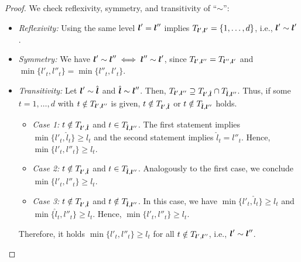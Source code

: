 \begin{proof}
  We check reflexivity, symmetry, and transitivity of ``$\sim$'':
  \begin{itemize}
    \item
    \emph{Reflexivity:}
    Using the same level ${\boldsymbol{l}}' = {\boldsymbol{l}}''$ implies
    $T_{{\boldsymbol{l}}',{\boldsymbol{l}}'} = \{1, \dotsc, d\}$,
    i.e., ${\boldsymbol{l}}' \sim {\boldsymbol{l}}'$.
    
    \item
    \emph{Symmetry:}
    We have
    ${\boldsymbol{l}}' \sim {\boldsymbol{l}}'' \iff {\boldsymbol{l}}'' \sim {\boldsymbol{l}}'$, since
    $T_{{\boldsymbol{l}}',{\boldsymbol{l}}''} = T_{{\boldsymbol{l}}'',{\boldsymbol{l}}'}$ and
    $\min\{l'_t, l''_t\} = \min\{l''_t, l'_t\}$.
    
    \item
    \emph{Transitivity:}
    Let ${\boldsymbol{l}}' \sim \hat{{\boldsymbol{l}}}$ and $\hat{{\boldsymbol{l}}} \sim {\boldsymbol{l}}''$.
    Then, $T_{{\boldsymbol{l}}',{\boldsymbol{l}}''} \supseteq T_{{\boldsymbol{l}}',\hat{{\boldsymbol{l}}}} \cap T_{\hat{{\boldsymbol{l}}},{\boldsymbol{l}}''}$.
    Thus, if some $t = 1, \dotsc, d$ with $t \notin T_{{\boldsymbol{l}}',{\boldsymbol{l}}''}$ is given,
    $t \notin T_{{\boldsymbol{l}}',\hat{{\boldsymbol{l}}}}$ or $t \notin T_{\hat{{\boldsymbol{l}}},{\boldsymbol{l}}''}$ holds.
    \begin{itemize}
      \item
      \emph{Case 1:}
      $t \notin T_{{\boldsymbol{l}}',\hat{{\boldsymbol{l}}}}$ and $t \in T_{\hat{{\boldsymbol{l}}},{\boldsymbol{l}}''}$.
      The first statement implies $\min\{l'_t, \hat{l}_t\} \ge l_t$
      and the second statement implies $\hat{l}_t = l''_t$.
      Hence,
      $\min\{l'_t, l''_t\} \ge l_t$.
      
      \item
      \emph{Case 2:}
      $t \notin T_{{\boldsymbol{l}}',\hat{{\boldsymbol{l}}}}$ and $t \in T_{\hat{{\boldsymbol{l}}},{\boldsymbol{l}}''}$.
      Analogously to the first case, we conclude $\min\{l'_t, l''_t\} \ge l_t$.
      
      \item
      \emph{Case 3:}
      $t \notin T_{{\boldsymbol{l}}',\hat{{\boldsymbol{l}}}}$ and $t \notin T_{\hat{{\boldsymbol{l}}},{\boldsymbol{l}}''}$.
      In this case, we have
      $\min\{l'_t, \hat{l}_t\} \ge l_t$ and $\min\{\hat{l}_t, l''_t\} \ge l_t$.
      Hence,
      $\min\{l'_t, l''_t\} \ge l_t$.
    \end{itemize}
    Therefore, it holds $\min\{l'_t, l''_t\} \ge l_t$
    for all $t \notin T_{{\boldsymbol{l}}',{\boldsymbol{l}}''}$, i.e., ${\boldsymbol{l}}' \sim {\boldsymbol{l}}''$.
    \qedhere
  \end{itemize}
\end{proof}

\lemmaCombiTechniqueIdenticalValues*

